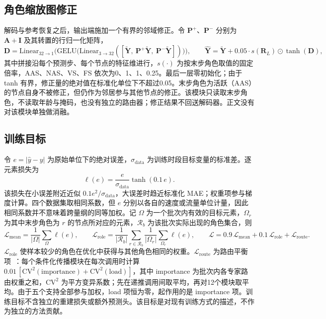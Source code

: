 \subsection{角色缩放图修正}\label{sec:3_6}

解码与参考恢复之后，输出端施加一个有界的邻域修正。令 $\mathbf{P}^{+}$、$\mathbf{P}^{-}$ 分别为 $\mathbf{A}+\mathbf{I}$ 及其转置的行归一化矩阵，
\begin{equation}\label{eq:13}
\mathbf{D}=\mathrm{Linear}_{32\to1}\Big(\mathrm{GELU}\big(\mathrm{Linear}_{3\to32}([\tilde{\mathbf{Y}},\ \mathbf{P}^{+}\tilde{\mathbf{Y}},\ \mathbf{P}^{-}\tilde{\mathbf{Y}}])\big)\Big),\qquad
\hat{\mathbf{Y}}=\tilde{\mathbf{Y}}+0.05\cdot s(\mathbf{R}_L)\odot\tanh(\mathbf{D}),
\end{equation}
其中拼接沿每个预测步、每个节点的特征维进行，$s(\cdot)$ 为按末步角色取值的固定倍率，AAS、NAS、VS、FS 依次为0、1、1、0.25。最后一层零初始化；由于 tanh 有界，修正量的绝对值在标准化单位下不超过0.05。末步角色为活跃（AAS）的节点自身不被修正，但仍作为邻居参与其他节点的修正。该模块只读取末步角色，不读取年龄与掩码，也没有独立的路由器；修正结果不回送解码器。正文没有对该模块单独做消融。

\subsection{训练目标}\label{sec:3_7}

令 $e=|\hat{y}-y|$ 为原始单位下的绝对误差，$\sigma_{\mathrm{data}}$ 为训练时段目标变量的标准差。逐元素损失为
\begin{equation}\label{eq:14}
\ell(e)=\frac{e}{\sigma_{\mathrm{data}}}\tanh(0.1\,e).
\end{equation}
该损失在小误差附近近似 $0.1e^2/\sigma_{\mathrm{data}}$，大误差时趋近标准化 MAE；权重项参与梯度计算。四个数据集取相同系数，但 $e$ 分别以各自的速度或流量单位计量，因此相同系数并不意味着跨量纲的同等加权。记 $\Omega$ 为一个批次内有效的目标元素，$\Omega_r$ 为其中末步角色为 $r$ 的节点所对应的元素，$\mathcal{R}_b$ 为该批次实际出现的角色集合，则
\begin{equation}\label{eq:15}
\mathcal{L}_{\mathrm{mean}}=\frac{1}{|\Omega|}\sum_{\Omega}\ell(e),\qquad
\mathcal{L}_{\mathrm{role}}=\frac{1}{|\mathcal{R}_b|}\sum_{r\in\mathcal{R}_b}\frac{1}{|\Omega_r|}\sum_{\Omega_r}\ell(e),\qquad
\mathcal{L}=0.9\,\mathcal{L}_{\mathrm{mean}}+0.1\,\mathcal{L}_{\mathrm{role}}+\mathcal{L}_{\mathrm{route}}.
\end{equation}
$\mathcal{L}_{\mathrm{role}}$ 使样本较少的角色在优化中获得与其他角色相同的权重。$\mathcal{L}_{\mathrm{route}}$ 为路由平衡项~\citep{shazeer2017outrageously,wang2023graph}：每个条件化传播模块在每次调用时计算 $0.01\,[\mathrm{CV}^2(\text{importance})+\mathrm{CV}^2(\text{load})]$，其中 importance 为批次内各专家路由权重之和，$\mathrm{CV}^2$ 为平方变异系数；先在递推调用间取平均，再对12个模块取平均。由于五个支持全部参与加权，load 项恒为零，起作用的是 importance 项。训练目标不含独立的重建损失或额外预测头。该目标是对现有训练方式的描述，不作为独立的方法贡献。


